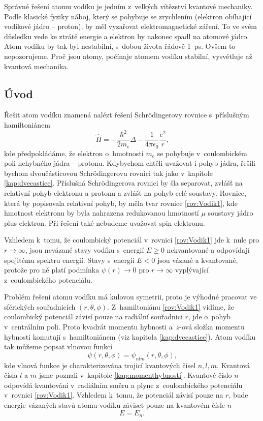 Správné řešení atomu vodíku je jedním z~velkých vítězství kvantové mechaniky. Podle klasické fyziky náboj, který se pohybuje se zrychlením (elektron obíhající vodíkové jádro -- proton), by měl vyzařovat elektromagnetické záření. To ve svém důsledku vede ke ztrátě energie a elektron by nakonec spadl na atomové jádro. Atom vodíku by tak byl nestabilní, s~dobou života řádově 1~ps. Ovšem to nepozorujeme. Proč jsou atomy, počínaje atomem vodíku stabilní, vysvětluje až kvantová mechanika.

\subsection{Úvod}
\label{kap:ObecnyUvod}

Řešit atom vodíku znamená nalézt řešení Schrödingerovy rovnice s~příslušným hamiltoniánem
\begin{equation}
\hat{H} = -\frac{\hbar^2}{2m_e}\Delta - \frac{1}{4\pi\epsilon_0}\frac{e^2}{r} \mbox{,}
\label{rov:Vodik1}
\end{equation}
kde předpokládáme, že elektron o~hmotnosti $m_e$ se pohybuje v~coulombickém poli nehybného jádra -- protonu. Kdybychom chtěli uvažovat i pohyb jádra, řešili bychom dvoučásticovou Schrödingerovu rovnici tak jako v~kapitole \ref{kap:dvecastice}. Příslušná Schrödingerova rovnici by šla separovat, zvlášť na relativní pohyb elektronu a protonu a zvlášť na pohyb celé soustavy. Rovnice, která by popisovala relativní pohyb, by měla tvar rovnice \eqref{rov:Vodik1}, kde hmotnost elektronu by byla nahrazena redukovanou hmotností $\mu$ soustavy jádro plus elektron. Při řešení také nebudeme uvažovat spin elektronu.

Vzhledem k~tomu, že coulombický potenciál v~rovnici \eqref{rov:Vodik1} jde k~nule pro $r \rightarrow \infty$, jsou nevázané stavy vodíku s~energií $E\geq0$ nekvantované a odpovídají spojitému spektru energií. Stavy s~energií $E<0$ jsou vázané a kvantované, protože pro ně platí podmínka $\psi(r) \rightarrow 0$ pro $r \rightarrow \infty$ vyplývající z~coulombického potenciálu.

Problém řešení atomu vodíku má kulovou symetrii, proto je výhodné pracovat ve sférických souřadnicích $(r, \theta, \phi)$. Z~hamiltoniánu \eqref{rov:Vodik1} vidíme, že coulombický potenciál závisí pouze na radiální souřadnici $r$, jde o~pohyb v~centrálním poli. Proto kvadrát momentu hybnosti a~$z$-ová složka momentu hybnosti komutují s~hamiltoniánem (viz kapitola \ref{kap:dvecastice}). Atom vodíku tak můžeme popsat vlnovou funkcí
\begin{equation}
\psi(r, \theta,\phi) = \psi_{nlm}(r, \theta,\phi) \mbox{,}
\label{rov:Vodik2}
\end{equation} 
kde vlnová funkce je charakterizována trojicí kvantových čísel $n,l,m$. Kvantová čísla $l$ a $m$ jsme poznali v~kapitole \ref{kap:momenthybnosti}. Kvantové číslo $n$ odpovídá kvantování v~radiálním směru a plyne z~coulombického potenciálu v~rovnici \eqref{rov:Vodik1}. Vzhledem k~tomu, že potenciál závisí pouze na $r$, bude energie vázaných stavů atomu vodíku záviset pouze na kvantovém čísle $n$
\begin{equation}
E = E_n \mbox{.}
\label{rov:Vodik3}
\end{equation}

